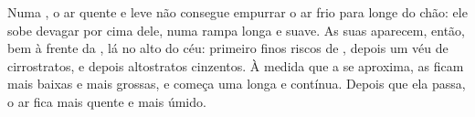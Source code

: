 Numa , o ar quente e leve não consegue empurrar o ar frio
para longe do chão: ele sobe devagar por cima dele, numa rampa longa e
suave. As suas  aparecem, então, bem à frente da , lá no alto
do céu: primeiro finos riscos de , depois um véu de cirrostratos, e
depois altostratos cinzentos. À medida que a  se aproxima, as 
ficam mais baixas e mais grossas, e começa uma  longa e contínua.
Depois que ela passa, o ar fica mais quente e mais úmido.

